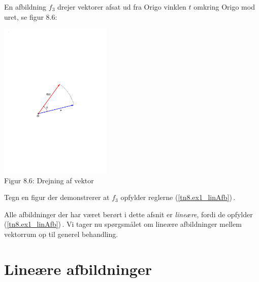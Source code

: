 \begin{exercise}\label{tn8.opgDrejning}
En afbildning $f_3$ drejer vektorer afsat ud fra Origo vinklen $t$ omkring Origo mod uret, se figur 8.6:
\begin{center}
		\includegraphics[trim=5cm 11cm 5cm
 11cm,width=0.40\textwidth,clip]{drejNY.pdf}
  \\Figur 8.6: Drejning af vektor 
\end{center}
Tegn en figur der demonstrerer at $f_3$ opfylder reglerne (\ref{tn8.ex1_linAfb})\,.
\end{exercise}

Alle afbildninger der har været berørt i dette afsnit er \textit{lineære}, fordi de opfylder (\ref{tn8.ex1_linAfb})\,. Vi tager nu spørgsmålet om lineære afbildninger mellem vektorrum op til generel behandling.

\section{Lineære afbildninger}

